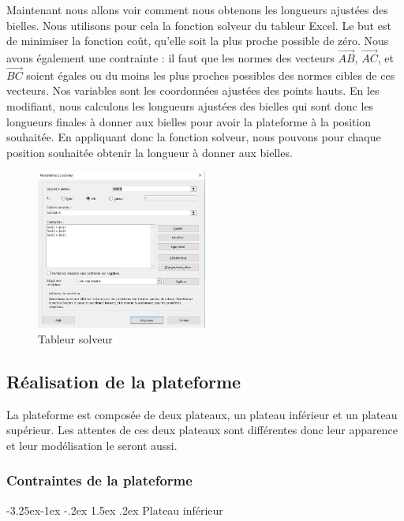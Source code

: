\documentclass[a4paper,12pt]{article}
\makeatletter
\newcounter{subsubsubsection}[subsubsection]
\newcommand\subsubsubsection{\@startsection{subsubsubsection}{4}{\z@}%
                                     {-3.25ex\@plus -1ex \@minus -.2ex}%
                                     {1.5ex \@plus .2ex}%
                                     {\normalfont\small\bfseries}}
\makeatother
\begin{document}
Maintenant nous allons voir comment nous obtenons les longueurs ajustées des bielles. 
Nous utilisons pour cela la fonction solveur du tableur Excel. 
Le but est de minimiser la fonction coût, qu'elle soit la plus proche possible de zéro. 
Nous avons également une contrainte : il faut que les normes des vecteurs $\overrightarrow{AB}$, $\overrightarrow{AC}$, et $\overrightarrow{BC}$ soient égales ou du moins les plus proches possibles des normes cibles de ces vecteurs. 
Nos variables sont les coordonnées ajustées des points hauts. 
En les modifiant, nous calculons les longueurs ajustées des bielles qui sont donc les longueurs finales à donner aux bielles pour avoir la plateforme à la position souhaitée. 
En appliquant donc la fonction solveur, nous pouvons pour chaque position souhaitée obtenir la longueur à donner aux bielles.


\begin{figure}[H]
  \centering
  \includegraphics[width=0.5\textwidth]{tableur solveur.jpg}
  \caption{Tableur solveur}
\end{figure}

\subsection{Réalisation de la plateforme}
La plateforme est composée de deux plateaux, un plateau inférieur et un plateau supérieur. 
Les attentes de ces deux plateaux sont différentes donc leur apparence et leur modélisation le seront aussi.

\subsubsection{Contraintes de la plateforme}

\subsubsubsection{Plateau inférieur}
\end{document}
